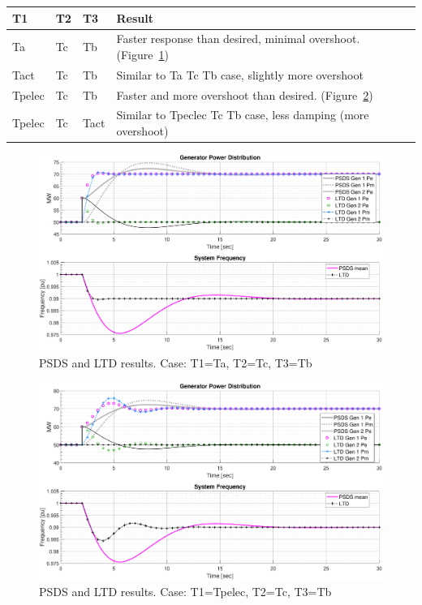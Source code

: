 \documentclass[12pt]{article}
\newcommand{\figW}{1}
\begin{document}
\begin{table}[!h]
	\begin{tabular}{l l l l}
	T1 & T2 & T3 & Result \\ \toprule
Ta & Tc & Tb & Faster response than desired, minimal overshoot.(Figure~\ref{TaTcTb})\\
Tact & Tc & Tb & Similar to Ta Tc Tb case, slightly more overshoot \\
Tpelec & Tc & Tb & Faster and more overshoot than desired. (Figure~\ref{TpelecTcTb})\\
Tpelec & Tc & Tact & Similar to Tpeclec Tc Tb case, less damping (more overshoot) 
	\end{tabular}
\end{table}
\pagebreak

	\begin{figure}[h!]	
				\centering
				\includegraphics[width=\figW\linewidth]{TaTcTb}  \vspace{-1.5em}
				\caption{PSDS and LTD results. Case: T1=Ta, T2=Tc, T3=Tb}
				\label{TaTcTb}
	\end{figure}

	\begin{figure}[h!]	
				\centering
				\includegraphics[width=\figW\linewidth]{TpelecTcTb}  \vspace{-1.5em}
				\caption{PSDS and LTD results. Case: T1=Tpelec, T2=Tc, T3=Tb}
				\label{TpelecTcTb}
	\end{figure}
\end{document}
